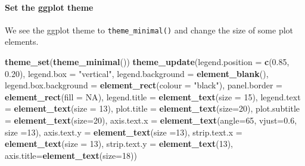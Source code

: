 \documentclass[
]{article}
\newenvironment{Shaded}{\begin{snugshade}}{\end{snugshade}}
\newcommand{\DataTypeTok}[1]{\textcolor[rgb]{0.13,0.29,0.53}{#1}}
\newcommand{\DecValTok}[1]{\textcolor[rgb]{0.00,0.00,0.81}{#1}}
\newcommand{\FloatTok}[1]{\textcolor[rgb]{0.00,0.00,0.81}{#1}}
\newcommand{\KeywordTok}[1]{\textcolor[rgb]{0.13,0.29,0.53}{\textbf{#1}}}
\newcommand{\NormalTok}[1]{#1}
\newcommand{\OtherTok}[1]{\textcolor[rgb]{0.56,0.35,0.01}{#1}}
\newcommand{\StringTok}[1]{\textcolor[rgb]{0.31,0.60,0.02}{#1}}
\begin{document}
\hypertarget{set-the-ggplot-theme}{%
\paragraph{Set the ggplot theme}\label{set-the-ggplot-theme}}

We see the ggplot theme to \texttt{theme\_minimal()} and change the size
of some plot elements.

\begin{Shaded}
\begin{Highlighting}[]
\KeywordTok{theme_set}\NormalTok{(}\KeywordTok{theme_minimal}\NormalTok{())}
\KeywordTok{theme_update}\NormalTok{(}\DataTypeTok{legend.position =} \KeywordTok{c}\NormalTok{(}\FloatTok{0.85}\NormalTok{, }\FloatTok{0.20}\NormalTok{),}
             \DataTypeTok{legend.box =} \StringTok{"vertical"}\NormalTok{,}
             \DataTypeTok{legend.background =} \KeywordTok{element_blank}\NormalTok{(),}
             \DataTypeTok{legend.box.background =} \KeywordTok{element_rect}\NormalTok{(}\DataTypeTok{colour =} \StringTok{"black"}\NormalTok{),}
             \DataTypeTok{panel.border =} \KeywordTok{element_rect}\NormalTok{(}\DataTypeTok{fill =} \OtherTok{NA}\NormalTok{),}
             \DataTypeTok{legend.title =} \KeywordTok{element_text}\NormalTok{(}\DataTypeTok{size =} \DecValTok{15}\NormalTok{),}
             \DataTypeTok{legend.text =} \KeywordTok{element_text}\NormalTok{(}\DataTypeTok{size =} \DecValTok{13}\NormalTok{),}
             \DataTypeTok{plot.title =} \KeywordTok{element_text}\NormalTok{(}\DataTypeTok{size=}\DecValTok{20}\NormalTok{),}
             \DataTypeTok{plot.subtitle =} \KeywordTok{element_text}\NormalTok{(}\DataTypeTok{size=}\DecValTok{20}\NormalTok{),}
             \DataTypeTok{axis.text.x =} \KeywordTok{element_text}\NormalTok{(}\DataTypeTok{angle=}\DecValTok{65}\NormalTok{, }\DataTypeTok{vjust=}\FloatTok{0.6}\NormalTok{, }\DataTypeTok{size =}\DecValTok{13}\NormalTok{),}
             \DataTypeTok{axis.text.y =} \KeywordTok{element_text}\NormalTok{(}\DataTypeTok{size =}\DecValTok{13}\NormalTok{),}
             \DataTypeTok{strip.text.x =} \KeywordTok{element_text}\NormalTok{(}\DataTypeTok{size =} \DecValTok{13}\NormalTok{),}
             \DataTypeTok{strip.text.y =} \KeywordTok{element_text}\NormalTok{(}\DecValTok{13}\NormalTok{),}
             \DataTypeTok{axis.title=}\KeywordTok{element_text}\NormalTok{(}\DataTypeTok{size=}\DecValTok{18}\NormalTok{))}
\end{Highlighting}
\end{Shaded}
\end{document}
